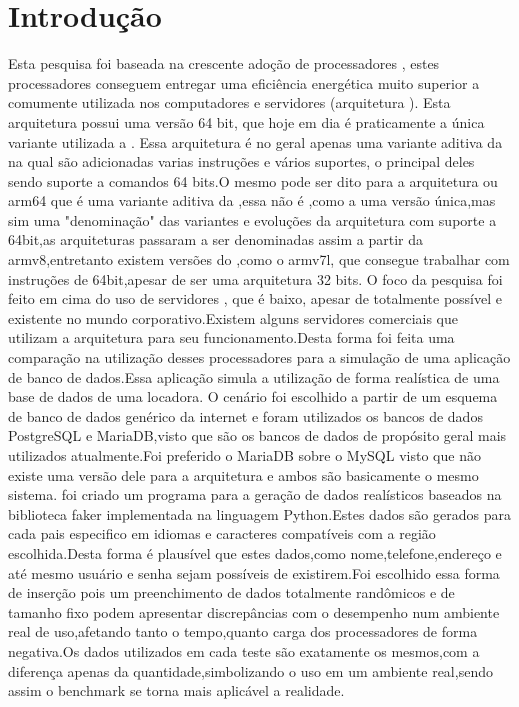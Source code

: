 \documentclass[
	12pt,				%
	openright,			%
	oneside,			%
	a4paper,			%
	english,			%
	french,				%
	spanish,			%
	brazil,				%
	]{abntex2}
\begin{document}
\chapter*{Introdução}
\label{chapter:introducao}
Esta pesquisa foi baseada na crescente adoção de processadores , estes processadores conseguem entregar uma eficiência energética muito superior a comumente utilizada nos computadores e servidores (arquitetura ). Esta arquitetura possui uma versão 64 bit, que hoje em dia é praticamente a única variante utilizada a . Essa arquitetura é no geral apenas uma variante aditiva da  na qual são adicionadas varias instruções e vários suportes, o principal deles sendo suporte a comandos 64 bits.O mesmo pode ser dito para a arquitetura  ou arm64 que é uma variante aditiva da ,essa não é ,como a  uma versão única,mas sim uma "denominação" das variantes e evoluções da arquitetura  com suporte a 64bit,as arquiteturas passaram a ser denominadas assim a partir da armv8,entretanto existem versões do ,como o armv7l, que consegue trabalhar com instruções de 64bit,apesar de ser uma arquitetura 32 bits.\newline
O foco da pesquisa foi feito em cima do uso de servidores , que é baixo, apesar de totalmente possível e existente no mundo corporativo.Existem alguns servidores comerciais que utilizam a arquitetura  para seu funcionamento.Desta forma foi feita uma comparação na utilização desses processadores para a simulação de uma aplicação de banco de dados.Essa aplicação simula a utilização de forma realística de uma base de dados de uma locadora. \newline
O cenário foi escolhido a partir de um esquema de banco de dados genérico da internet e foram utilizados os bancos de dados PostgreSQL e MariaDB,visto que são os bancos de dados de propósito geral mais utilizados atualmente.Foi preferido o MariaDB sobre o MySQL visto que não existe uma versão dele para a arquitetura  e ambos são basicamente o mesmo sistema.\newline
foi criado um programa para a geração de dados realísticos baseados na biblioteca faker implementada na linguagem Python.Estes dados são gerados para cada pais especifico em idiomas e caracteres compatíveis com a região escolhida.Desta forma é plausível que estes dados,como nome,telefone,endereço e até mesmo usuário e senha sejam possíveis de existirem.Foi escolhido essa forma de inserção pois um preenchimento de dados totalmente randômicos e de tamanho fixo podem apresentar discrepâncias com o desempenho num ambiente real de uso,afetando tanto o tempo,quanto carga dos processadores de forma negativa.Os dados utilizados em cada teste são exatamente os mesmos,com a diferença apenas da quantidade,simbolizando o uso em um ambiente real,sendo assim o benchmark se torna mais aplicável a realidade.\newline
\end{document}
